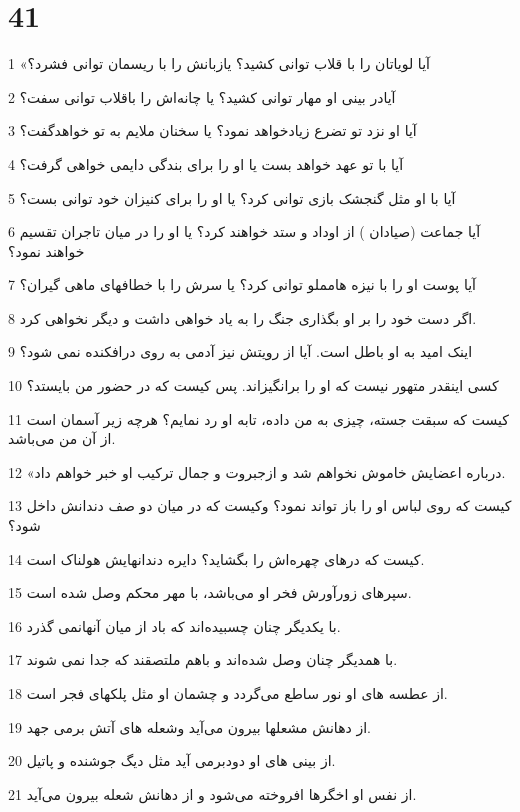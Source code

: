 \chapter{41}

\par 1 «آیا لویاتان را با قلاب توانی کشید؟ یازبانش را با ریسمان توانی فشرد؟
\par 2 آیادر بینی او مهار توانی کشید؟ یا چانه‌اش را باقلاب توانی سفت؟
\par 3 آیا او نزد تو تضرع زیادخواهد نمود؟ یا سخنان ملایم به تو خواهدگفت؟
\par 4 آیا با تو عهد خواهد بست یا او را برای بندگی دایمی خواهی گرفت؟
\par 5 آیا با او مثل گنجشک بازی توانی کرد؟ یا او را برای کنیزان خود توانی بست؟
\par 6 آیا جماعت (صیادان ) از اوداد و ستد خواهند کرد؟ یا او را در میان تاجران تقسیم خواهند نمود؟
\par 7 آیا پوست او را با نیزه هامملو توانی کرد؟ یا سرش را با خطافهای ماهی گیران؟
\par 8 اگر دست خود را بر او بگذاری جنگ را به یاد خواهی داشت و دیگر نخواهی کرد.
\par 9 اینک امید به او باطل است. آیا از رویتش نیز آدمی به روی درافکنده نمی شود؟
\par 10 کسی اینقدر متهور نیست که او را برانگیزاند. پس کیست که در حضور من بایستد؟
\par 11 کیست که سبقت جسته، چیزی به من داده، تابه او رد نمایم؟ هرچه زیر آسمان است از آن من می‌باشد.
\par 12 «درباره اعضایش خاموش نخواهم شد و ازجبروت و جمال ترکیب او خبر خواهم داد.
\par 13 کیست که روی لباس او را باز تواند نمود؟ وکیست که در میان دو صف دندانش داخل شود؟
\par 14 کیست که درهای چهره‌اش را بگشاید؟ دایره دندانهایش هولناک است.
\par 15 سپرهای زورآورش فخر او می‌باشد، با مهر محکم وصل شده است.
\par 16 با یکدیگر چنان چسبیده‌اند که باد از میان آنهانمی گذرد.
\par 17 با همدیگر چنان وصل شده‌اند و باهم ملتصقند که جدا نمی شوند.
\par 18 از عطسه های او نور ساطع می‌گردد و چشمان او مثل پلکهای فجر است.
\par 19 از دهانش مشعلها بیرون می‌آید وشعله های آتش برمی جهد.
\par 20 از بینی های او دودبرمی آید مثل دیگ جوشنده و پاتیل.
\par 21 از نفس او اخگرها افروخته می‌شود و از دهانش شعله بیرون می‌آید.
